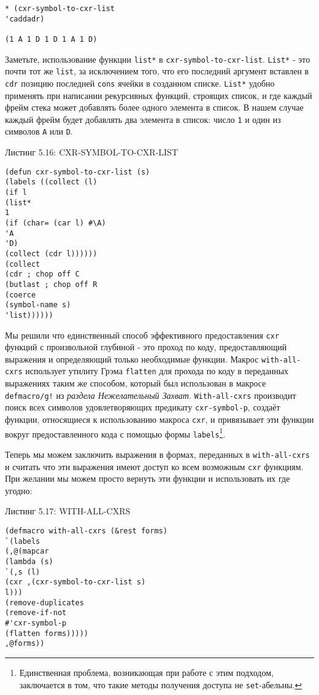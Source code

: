 \begin{verbatim}
* (cxr-symbol-to-cxr-list
'caddadr)

(1 A 1 D 1 D 1 A 1 D)
\end{verbatim}

Заметьте, использование функции \verb"list*" в \verb"cxr-symbol-to-cxr-list". \verb"List*" - это почти тот же \verb"list", за исключением того, что его последний аргумент вставлен в \verb"cdr" позицию последней \verb"cons" ячейки в созданном списке. \verb"List*" удобно применять при написании рекурсивных функций, строящих список, и где каждый фрейм стека может добавлять более одного элемента в список. В нашем случае каждый фрейм будет добавлять два элемента в список: число \verb"1" и один из символов \verb"A" или \verb"D".

Листинг 5.16: CXR-SYMBOL-TO-CXR-LIST\label{listing_5.16}
\listbegin
\begin{verbatim}
(defun cxr-symbol-to-cxr-list (s)
(labels ((collect (l)
(if l
(list*
1
(if (char= (car l) #\A)
'A
'D)
(collect (cdr l))))))
(collect
(cdr ; chop off C
(butlast ; chop off R
(coerce
(symbol-name s)
'list))))))
\end{verbatim}
\listend


Мы решили что единственный способ эффективного предоставления \verb"cxr" функций с произвольной глубиной - это проход по коду, предоставляющий выражения и определяющий только необходимые функции. Макрос \verb"with-all-cxrs" использует утилиту Грэма \verb"flatten" для прохода по коду в переданных выражениях таким же способом, который был использован в макросе \verb"defmacro/g!" из \emph{раздела Нежелательный Захват}. \verb"With-all-cxrs" производит поиск всех символов удовлетворяющих предикату \verb"cxr-symbol-p", создаёт функции, относящиеся к использованию макроса \verb"cxr", и привязывает эти функции вокруг предоставленного кода с помощью формы \verb"labels"\footnote{Единственная проблема, возникающая при работе с этим подходом, заключается в том, что такие методы получения доступа не \verb"set"-абельны.}.

Теперь мы можем заключить выражения в формах, переданных в \verb"with-all-cxrs" и считать что эти выражения имеют доступ ко всем возможным \verb"cxr" функциям. При желании мы можем просто вернуть эти функции и использовать их где угодно:

Листинг 5.17: WITH-ALL-CXRS\label{listing_5.17}
\listbegin
\begin{verbatim}
(defmacro with-all-cxrs (&rest forms)
`(labels
(,@(mapcar
(lambda (s)
`(,s (l)
(cxr ,(cxr-symbol-to-cxr-list s)
l)))
(remove-duplicates
(remove-if-not
#'cxr-symbol-p
(flatten forms)))))
,@forms))
\end{verbatim}
\listend

